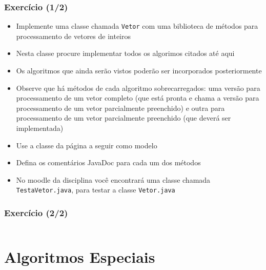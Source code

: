 \documentclass[xcolor={dvipsnames,table},aspectratio=169]{beamer}
\begin{document}
\begin{frame}[fragile]\frametitle{Exercício (1/2)}
\begin{itemize}
	\item Implemente uma classe chamada \texttt{Vetor} com uma biblioteca de métodos para processamento de vetores de inteiros
	\item Nesta classe procure implementar todos os algorimos citados até aqui
	\item Os algoritmos que ainda serão vistos poderão ser incorporados posteriormente
	\item Observe que há métodos de cada algoritmo sobrecarregados: uma versão para processamento de um vetor completo (que está pronta e chama a versão para processamento de um vetor parcialmente preenchido) e outra para processamento de um vetor parcialmente preenchido (que deverá ser implementada)
	\item Use a classe da página a seguir como modelo
	\item Defina os comentários JavaDoc para cada um dos métodos
	\item No moodle da disciplina você encontrará uma classe chamada \texttt{TestaVetor.java}, para testar a classe \texttt{Vetor.java}
\end{itemize}
\end{frame}

\begin{frame}[fragile]\frametitle{Exercício (2/2)}
\tiny{\inputminted[bgcolor=cyan!10]{java}{src/Vetor.java}}
\end{frame}

\section{Algoritmos Especiais}
\end{document}
